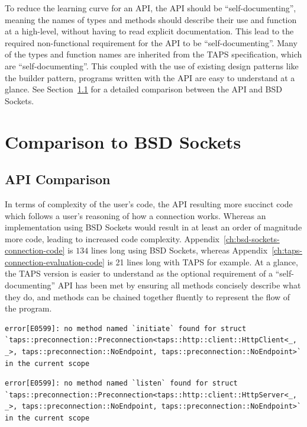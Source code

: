 To reduce the learning curve for an API, the API should be “self-documenting'', meaning the names of types and methods
should describe their use and function at a high-level, without having to read explicit documentation.
This lead to the required non-functional requirement for the API to be “self-documenting''.
Many of the types and function names are inherited from the TAPS specification, which are ``self-documenting''.
This coupled with the use of existing design patterns like the builder pattern, programs written with the API are easy
to understand at a glance.
See Section~\ref{subsec:api-comparison} for a detailed comparison between the API and BSD Sockets.

\section{Comparison to BSD Sockets}\label{sec:comparison-to-bsd-sockets}

\subsection{API Comparison}\label{subsec:api-comparison}

In terms of complexity of the user's code, the API resulting more succinct code which follows a user's reasoning of how
a connection works.
Whereas an implementation using BSD Sockets would result in at least an order of magnitude more code, leading to
increased code complexity.
Appendix~\ref{ch:bsd-sockets-connection-code} is \(134\) lines long using BSD Sockets, whereas
Appendix~\ref{ch:taps-connection-evaluation-code} is 21 lines long with TAPS for example.
At a glance, the TAPS version is easier to understand as the optional requirement of a “self-documenting” API has been
met by ensuring all methods concisely describe what they do, and methods can be chained together fluently to represent
the flow of the program.

\begin{lstlisting}[float=h!, caption={The compiler error produced if a Preconnection without a remote endpoint is used to
initiate a Connection.}, label=lst:clientError]
error[E0599]: no method named `initiate` found for struct `taps::preconnection::Preconnection<taps::http::client::HttpClient<_, _>, taps::preconnection::NoEndpoint, taps::preconnection::NoEndpoint>` in the current scope
\end{lstlisting}

\begin{lstlisting}[float=h!, caption={The compiler error produced if a Preconnection without a local endpoint is used to
listen for Connections.}, label=lst:serverError]
error[E0599]: no method named `listen` found for struct `taps::preconnection::Preconnection<taps::http::client::HttpServer<_, _>, taps::preconnection::NoEndpoint, taps::preconnection::NoEndpoint>` in the current scope
\end{lstlisting}

